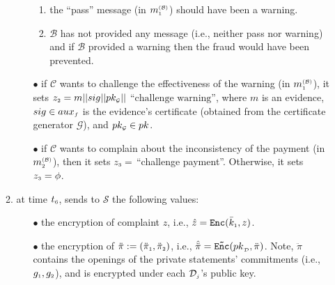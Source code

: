 \begin{enumerate}
\begin{enumerate}
\begin{itemize}
 \begin{enumerate}[label=(\roman*)]
  \item the ``pass'' message (in $m^{\scriptscriptstyle\mathcal{(B)}}_{\scriptscriptstyle 1}$)  should have been a warning.
  
 \item $\mathcal{B}$ has not provided any message (i.e., neither pass nor warning)   and if $\mathcal{B}$  provided a warning  then  the fraud would have been  prevented.  
 

   \end{enumerate}
   \item [$\bullet$] if $\mathcal{C}$ wants to challenge the effectiveness of the warning (in $m^{\scriptscriptstyle\mathcal{(B)}}_{\scriptscriptstyle 1}$),  it sets $z_{\scriptscriptstyle 2}= m||sig||pk_{\scriptscriptstyle\mathcal{G}}||$ $\text{``challenge warning''}$, where  $m$ is an evidence,   $sig\in aux_{\scriptscriptstyle f}$ is the evidence's  certificate (obtained from the certificate generator $\mathcal{G}$), and $pk_{\scriptscriptstyle\mathcal{G}}\in pk$.  
 

  \item [$\bullet$] if $\mathcal{C}$ wants to complain about the inconsistency of the payment (in $m^{\scriptscriptstyle\mathcal{(B)}}_{\scriptscriptstyle 2}$), then it sets  $z_{\scriptscriptstyle 3} =$ ``challenge payment''. Otherwise, it sets $
z_{\scriptscriptstyle 3}=\phi $.

    \end{itemize}
    \item at time $t_{\scriptscriptstyle 6}$, sends to $\mathcal{S}$ the following values: 
    
    \begin{itemize}
     \item[$\bullet$] the encryption of complaint $z$, i.e.,   $\hat z= \mathtt{Enc}(\bar k_{\scriptscriptstyle 1}, z)$.
     \item[$\bullet$] the encryption of $\ddot{\pi}:=(\ddot{\pi}_{\scriptscriptstyle 1}, \ddot{\pi}_{\scriptscriptstyle 2})$, i.e., $\hat{\ddot \pi}=\mathtt{\tilde{Enc}}({pk}_{\scriptscriptstyle\mathcal {D}}, \ddot \pi)$. Note, $\ddot \pi$ contains the openings of the private statements' commitments (i.e., $g_{\scriptscriptstyle 1}, g_{\scriptscriptstyle 2}$), and is encrypted under each $\mathcal{D}_{\scriptscriptstyle j}$'s public key. 
     \end{itemize}
\end{enumerate}




\end{enumerate}
